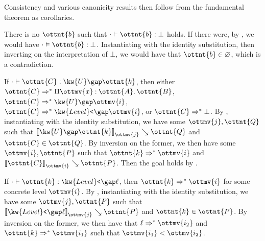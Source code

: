 \documentclass[a4paper,UKenglish,cleveref,autoref,thm-restate]{lipics-v2021}
\begin{document}
Consistency and various canonicity results then follow from the fundamental theorem as corollaries.

\begin{corollary}[Consistency]
  There is no $\ottnt{b}$ such that $  \cdot   \vdash  \ottnt{b}  \mathrel{:}   \bot  $ holds.
  If there were, by ,
  we would have $  \cdot   \vDash  \ottnt{b}  :   \bot  $.
  Instantiating with the identity substitution,
  then inverting on the interpretation of $ \bot $,
  we would have that $ \ottnt{b}  \in   \varnothing  $, which is a contradiction.
\end{corollary}

\begin{corollary}
  If $  \cdot   \vdash  \ottnt{C}  \mathrel{:}   \kw{U} \gap  \ottnt{k}  $,
  then either $ \ottnt{C}  \Rightarrow^\ast   \Pi  \ottmv{x}  \mathbin{:}  \ottnt{A}  \mathpunct{.}  \ottnt{B}  $, $ \ottnt{C}  \Rightarrow^\ast   \kw{U} \gap   \ottmv{i}   $, $ \ottnt{C}  \Rightarrow^\ast   \kw{Level}\texttt{<} \gap   \ottmv{i}   $, or $ \ottnt{C}  \Rightarrow^\ast   \bot  $.
  By ,
  instantiating with the identity substitution,
  we have some $\ottmv{j}, \ottnt{Q}$ such that $ \mathopen{\llbracket}   \kw{U} \gap  \ottnt{k}   \mathclose{\rrbracket}_{ \ottmv{j} } \searrow  \ottnt{Q} $ and $ \ottnt{C}  \in  \ottnt{Q} $.
  By inversion on the former,
  we then have some $\ottmv{i}, \ottnt{P}$ such that $ \ottnt{k}  \Rightarrow^\ast   \ottmv{i}  $ and $ \mathopen{\llbracket}  \ottnt{C}  \mathclose{\rrbracket}_{ \ottmv{i} } \searrow  \ottnt{P} $.
  Then the goal holds by .
\end{corollary}

\begin{corollary}
  If $  \cdot   \vdash  \ottnt{k}  \mathrel{:}   \kw{Level}\texttt{<} \gap  \ell  $,
  then $ \ottnt{k}  \Rightarrow^\ast   \ottmv{i}  $ for some concrete level $\ottmv{i}$.
  By ,
  instantiating with the identity substitution,
  we have some $\ottmv{j}, \ottnt{P}$ such that $ \mathopen{\llbracket}   \kw{Level}\texttt{<} \gap  \ell   \mathclose{\rrbracket}_{ \ottmv{j} } \searrow  \ottnt{P} $ and $ \ottnt{k}  \in  \ottnt{P} $.
  By inversion on the former,
  we then have that $ \ell  \Rightarrow^\ast   \ottmv{i_{{\mathrm{2}}}}  $ and $ \ottnt{k}  \Rightarrow^\ast   \ottmv{i_{{\mathrm{1}}}}  $ such that $ \ottmv{i_{{\mathrm{1}}}}  <  \ottmv{i_{{\mathrm{2}}}} $.
\end{corollary}
\end{document}
